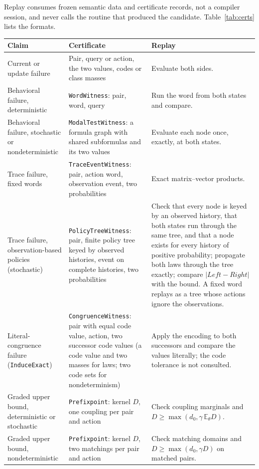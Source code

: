 \documentclass[11pt]{article}
\newcommand{\code}[1]{\texttt{#1}}
\begin{document}
Replay consumes frozen semantic data and certificate records, not a compiler session, and never calls
the routine that produced the candidate. Table~\ref{tab:certs} lists the formats.

\begin{longtable}{>{\raggedright\arraybackslash}p{3.4cm}>{\raggedright\arraybackslash}p{5.0cm}>{\raggedright\arraybackslash}p{5.4cm}}
\toprule
Claim & Certificate & Replay\\
\midrule
\endhead
Current or update failure & Pair, query or action, the two values, codes or class masses & Evaluate both sides.\\
Behavioral failure, deterministic & \code{WordWitness}: pair, word, query & Run the word from both states and compare.\\
Behavioral failure, stochastic or nondeterministic & \code{ModalTestWitness}: a formula graph with shared subformulas and its two values & Evaluate each node once, exactly, at both states.\\
Trace failure, fixed words & \code{TraceEventWitness}: pair, action word, observation event, two probabilities & Exact matrix--vector products.\\
Trace failure, observation-based policies (stochastic) & \code{PolicyTreeWitness}: pair, finite policy tree keyed by observed histories, event on complete histories, two probabilities & Check that every node is keyed by an observed history, that both states run through the same tree, and that a node exists for every history of positive probability; propagate both laws through the tree exactly; compare $|\mathit{Left}-\mathit{Right}|$ with the bound. A fixed word replays as a tree whose actions ignore the observations.\\
Literal-congruence failure (\code{InduceExact}) & \code{CongruenceWitness}: pair with equal code value, action, two successor code values (a code value and two masses for laws; two code sets for nondeterminism) & Apply the encoding to both successors and compare the values literally; the code tolerance is not consulted.\\
Graded upper bound, deterministic or stochastic & \code{Prefixpoint}: kernel $D$, one coupling per pair and action & Check coupling marginals and $D\ge\max(d_0,\gamma\,\mathbb E_\theta D)$.\\
Graded upper bound, nondeterministic & \code{Prefixpoint}: kernel $D$, two matchings per pair and action & Check matching domains and $D\ge\max(d_0,\gamma D)$ on matched pairs.\\

\end{longtable}
\end{document}
